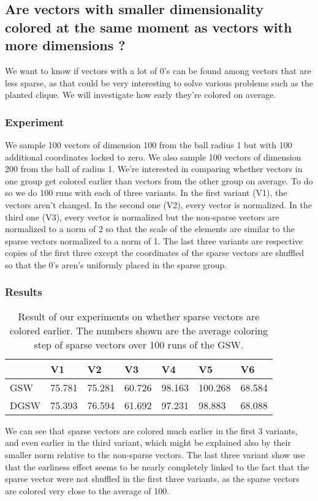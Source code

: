 \documentclass[12pt]{article}
\begin{document}
\subsection{Are vectors with smaller dimensionality colored at the same moment as vectors with more dimensions ?}\label{smaller_dimensionality}
We want to know if vectors with a lot of 0's can be found among vectors that are less sparse, as that could be very interesting to solve various problems such as the planted clique. We will investigate how early they're colored on average.

\subsubsection{Experiment}
We sample 100 vectors of dimension 100 from the ball radius 1 but with 100 additional coordinates locked to zero. We also sample 100 vectors of dimension 200 from the ball of radius 1. We're interested in comparing whether vectors in one group get colored earlier than vectors from the other group on average. To do so we do 100 runs with each of three variants. In the first variant (V1), the vectors aren't changed. In the second one (V2), every vector is normalized. In the third one (V3), every vector is normalized but the non-sparse vectors are normalized to a norm of 2 so that the scale of the elements are similar to the sparse vectors normalized to a norm of 1. The last three variants are respective copies of the first three except the coordinates of the sparse vectors are shuffled so that the 0's aren's uniformly placed in the sparse group.

\subsubsection{Results}
\begin{center}
\begin{table}[h]
\begin{tabular}{l|llllll}
 &V1&V2&V3&V4&V5&V6\\
\hline
GSW&75.781&75.281&60.726&98.163&100.268&68.584\\
DGSW&75.393&76.594&61.692&97.231&98.883&68.088
\end{tabular}
\caption{Result of our experiments on whether sparse vectors are colored earlier. The numbers shown are the average coloring step of sparse vectors over 100 runs of the GSW.}
\label{pivot_longer}
\end{table}
\end{center}
We can see that sparse vectors are colored much earlier in the first 3 variants, and even earlier in the third variant, which might be explained also by their smaller norm relative to the non-sparse vectors. The last three variant show use that the earliness effect seems to be nearly completely linked to the fact that the sparse vector were not shuffled in the first three variants, as the sparse vectors are colored very close to the average of 100.
\end{document}
